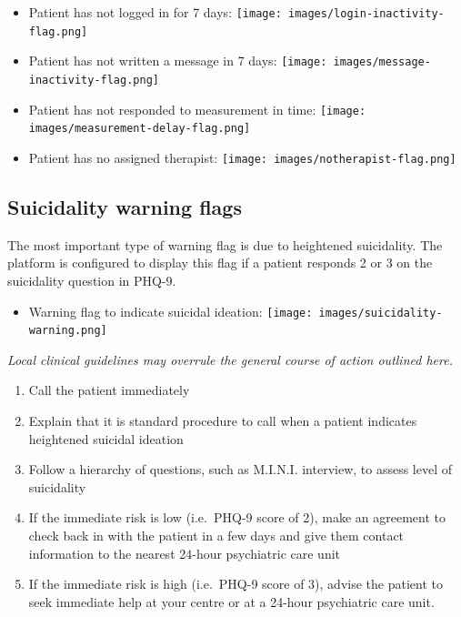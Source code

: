\documentclass[]{book}
\providecommand{\tightlist}{%
  \setlength{\itemsep}{0pt}\setlength{\parskip}{0pt}}
\theoremstyle{definition}
\theoremstyle{definition}
\theoremstyle{definition}
\theoremstyle{remark}
\begin{document}
\begin{itemize}
\tightlist
\item
  Patient has not logged in for 7 days:
  \texttt{[image: images/login-inactivity-flag.png]}
\item
  Patient has not written a message in 7 days:
  \texttt{[image: images/message-inactivity-flag.png]}
\item
  Patient has not responded to measurement in time:
  \texttt{[image: images/measurement-delay-flag.png]}
\item
  Patient has no assigned therapist:
  \texttt{[image: images/notherapist-flag.png]}
\end{itemize}

\hypertarget{suicidality-warning-flags}{%
\subsection{Suicidality warning flags}\label{suicidality-warning-flags}}

The most important type of warning flag is due to heightened
suicidality. The platform is configured to display this flag if a
patient responds 2 or 3 on the suicidality question in PHQ-9.

\begin{itemize}
\tightlist
\item
  Warning flag to indicate suicidal ideation:
  \texttt{[image: images/suicidality-warning.png]}
\end{itemize}

\emph{Local clinical guidelines may overrule the general course of
action outlined here.}

\begin{enumerate}
\def\labelenumi{\arabic{enumi}.}
\tightlist
\item
  Call the patient immediately
\item
  Explain that it is standard procedure to call when a patient indicates
  heightened suicidal ideation
\item
  Follow a hierarchy of questions, such as M.I.N.I. interview, to assess
  level of suicidality
\item
  If the immediate risk is low (i.e.~PHQ-9 score of 2), make an
  agreement to check back in with the patient in a few days and give
  them contact information to the nearest 24-hour psychiatric care unit
\item
  If the immediate risk is high (i.e.~PHQ-9 score of 3), advise the
  patient to seek immediate help at your centre or at a 24-hour
  psychiatric care unit.
\end{enumerate}
\end{document}
